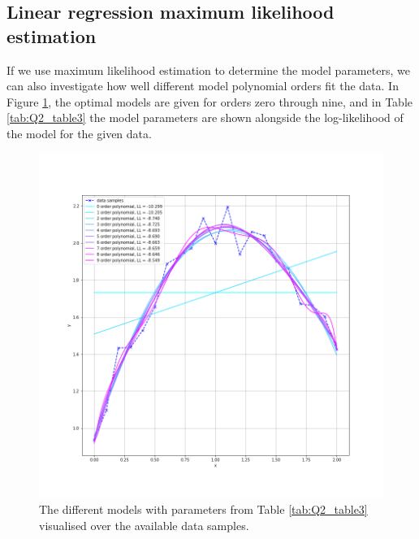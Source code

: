 \documentclass{article}
\begin{document}
\subsection{Linear regression maximum likelihood estimation}
If we use maximum likelihood estimation to determine the model parameters, we can also investigate how well different model polynomial orders fit the data. In Figure \ref{fig:Q2a_2}, the optimal models are given for orders zero through nine, and in Table \ref{tab:Q2_table3} the model parameters are shown alongside the log-likelihood of the model for the given data. 
\begin{figure}
    \centering
    \includegraphics[scale=0.3]{Q2a_fig3.png}
    \caption{The different models with parameters from Table \ref{tab:Q2_table3} visualised over the available data samples.}
    \label{fig:Q2a_2}
\end{figure}
\end{document}
